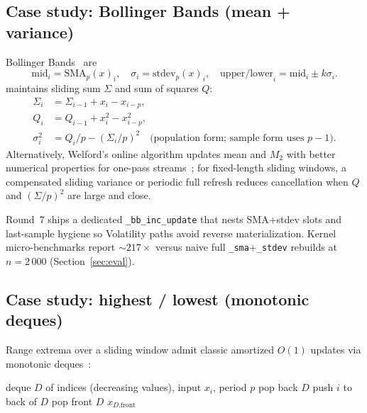 \documentclass[11pt,a4paper]{article}
\begin{document}
\subsection{Case study: Bollinger Bands (mean + variance)}
\label{sec:inc-bb}

Bollinger Bands~\citep{bollinger2001} are
\begin{equation}
  \mathrm{mid}_i=\mathrm{SMA}_p(x)_i,\quad
  \sigma_i=\mathrm{stdev}_p(x)_i,\quad
  \mathrm{upper/lower}_i=\mathrm{mid}_i \pm k\sigma_i.
\end{equation}
\pyne{} maintains sliding sum $\Sigma$ and sum of squares $Q$:
\begin{align}
  \Sigma_i &= \Sigma_{i-1}+x_i-x_{i-p}, \\
  Q_i &= Q_{i-1}+x_i^2-x_{i-p}^2, \\
  \sigma_i^2 &= Q_i/p - (\Sigma_i/p)^2
  \quad\text{(population form; sample form uses $p-1$)}.
\end{align}
Alternatively, Welford's online algorithm updates mean and $M_2$ with better
numerical properties for one-pass streams~\citep{higham2002accuracy,press2007numerical};
for fixed-length sliding windows, a compensated sliding variance or periodic
full refresh reduces cancellation when $Q$ and $(\Sigma/p)^2$ are large and
close.

Round~7 ships a dedicated \texttt{\_bb\_inc\_update} that nests SMA+stdev
slots and last-sample hygiene so Volatility paths avoid reverse materialization.
Kernel micro-benchmarks report $\sim 217\times$ versus naive full
\texttt{\_sma}+\texttt{\_stdev} rebuilds at $n=2\,000$
(Section~\ref{sec:eval}).

\subsection{Case study: highest / lowest (monotonic deques)}
\label{sec:inc-hl}

Range extrema over a sliding window admit classic amortized $O(1)$ updates via
monotonic deques~\citep{aho2006dragon}:

\begin{algorithm}[t]
\caption{Sliding window maximum (highest)}
\label{alg:highest}
\begin{algorithmic}[1]
\Require deque $D$ of indices (decreasing values), input $x_i$, period $p$
  \State pop back $D$
\EndWhile
\State push $i$ to back of $D$
  \State pop front $D$
\EndWhile
\State \Return $x_{D.\mathrm{front}}$ 
\end{algorithmic}
\end{algorithm}
\end{document}
